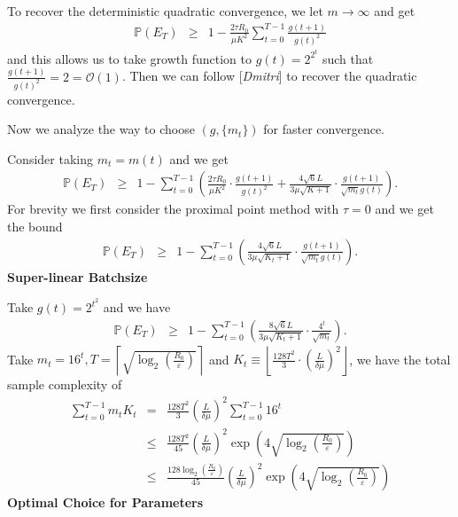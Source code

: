\documentclass{article}
\newcommand{\cdummy}{\cdot}
\newcommand{\tmem}[1]{{\em #1\/}}
\newcommand{\tmstrong}[1]{\textbf{#1}}
\begin{document}
\begin{remark}
  To recover the deterministic quadratic convergence, we let $m \rightarrow
  \infty$ and get
  \begin{eqnarray*}
    \mathbb{P} (E_T) & \geq & 1 - \frac{2 \tau R_0}{\mu K^2} \sum_{t = 0}^{T -
    1} \frac{g (t + 1)}{g (t)^2}
  \end{eqnarray*}
  and this allows us to take growth function to $g (t) = 2^{2^t}$ such that
  $\frac{g (t + 1)}{g (t)^2} = 2 =\mathcal{O} (1)$. Then we can follow
  [{\tmem{Dmitri}}] to recover the quadratic convergence.
\end{remark}

Now we analyze the way to choose $(g, \{ m_t \})$ for faster convergence.

Consider taking $m_t = m (t)$ and we get
\begin{eqnarray*}
  \mathbb{P} (E_T) & \geq & 1 - \sum_{t = 0}^{T - 1} \left( \frac{2 \tau
  R_0}{\mu K^2} \cdummy \frac{g (t + 1)}{g (t)^2} + \frac{4 \sqrt{6} L}{3 \mu
  \sqrt{K + 1}} \cdummy \frac{g (t + 1)}{\sqrt{m_t} g (t)} \right) .
\end{eqnarray*}
For brevity we first consider the proximal point method with $\tau = 0$ and we
get the bound
\begin{eqnarray*}
  \mathbb{P} (E_T) & \geq & 1 - \sum_{t = 0}^{T - 1} \left( \frac{4 \sqrt{6}
  L}{3 \mu \sqrt{K_t + 1}} \cdummy \frac{g (t + 1)}{\sqrt{m_t} g (t)} \right)
  .
\end{eqnarray*}
{\tmstrong{Super-linear Batchsize}}

Take $g (t) = 2^{t^2}$ and we have
\begin{eqnarray*}
  \mathbb{P} (E_T) & \geq & 1 - \sum_{t = 0}^{T - 1} \left( \frac{8 \sqrt{6}
  L}{3 \mu \sqrt{K_t + 1}} \cdummy \frac{4^t}{\sqrt{m_t}} \right) .
\end{eqnarray*}
Take $m_t = 16^t, T = \left\lceil \sqrt{\log_2 \left( \frac{R_0}{\varepsilon}
\right)} \right\rceil$ and $K_t \equiv \left\lfloor \frac{128 T^2}{3} \cdummy
\left( \frac{L}{\delta \mu} \right)^2 \right\rfloor$, we have the total sample
complexity of
\begin{eqnarray*}
  \sum_{t = 0}^{T - 1} m_t K_t & = & \frac{128 T^2}{3} \left( \frac{L}{\delta
  \mu} \right)^2 \sum_{t = 0}^{T - 1} 16^t\\
  & \leq & \frac{128 T^2}{45} \left( \frac{L}{\delta \mu} \right)^2 \exp
  \left( 4 \sqrt{\log_2 \left( \frac{R_0}{\varepsilon} \right)} \right) \\
  & \leq & \frac{128 \log_2 \left( \frac{R_0}{\varepsilon} \right)}{45}
  \left( \frac{L}{\delta \mu} \right)^2 \exp \left( 4 \sqrt{\log_2 \left(
  \frac{R_0}{\varepsilon} \right)} \right)
\end{eqnarray*}
{\tmstrong{Optimal Choice for Parameters}}
\end{document}
